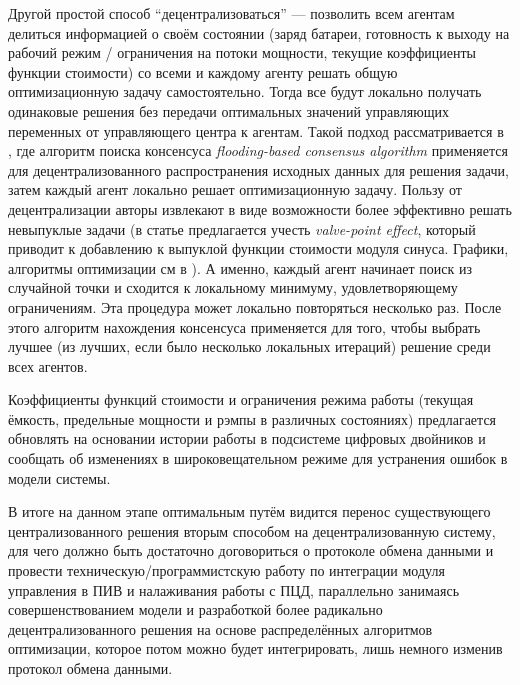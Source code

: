 \documentclass{report}
\begin{document}
Другой простой способ ``децентрализоваться'' --- позволить всем агентам делиться информацией о своём состоянии (заряд батареи, готовность к выходу на рабочий режим / ограничения на потоки мощности, текущие коэффициенты функции стоимости) со всеми и каждому агенту решать общую оптимизационную задачу самостоятельно.
Тогда все будут локально получать одинаковые решения без передачи оптимальных значений управляющих переменных от управляющего центра к агентам.
Такой подход рассматривается в \cite{elsayed2014fully}, где алгоритм поиска консенсуса \textit{flooding-based consensus algorithm} применяется для децентрализованного распространения исходных данных для решения задачи, затем каждый агент локально решает оптимизационную задачу.
Пользу от децентрализации авторы извлекают в виде возможности более эффективно решать невыпуклые задачи (в статье предлагается учесть \textit{valve-point effect}, который приводит к добавлению к выпуклой функции стоимости модуля синуса. Графики, алгоритмы оптимизации см в \cite{sharma2017solution}).
А именно, каждый агент начинает поиск из случайной точки и сходится к локальному минимуму, удовлетворяющему ограничениям.
Эта процедура может локально повторяться несколько раз.
После этого алгоритм нахождения консенсуса применяется для того, чтобы выбрать лучшее (из лучших, если было несколько локальных итераций) решение среди всех агентов.

Коэффициенты функций стоимости и ограничения режима работы (текущая ёмкость, предельные мощности и рэмпы в различных состояниях) предлагается обновлять на основании истории работы в подсистеме цифровых двойников и сообщать об изменениях в широковещательном режиме для устранения ошибок в модели системы.

В итоге на данном этапе оптимальным путём видится перенос существующего централизованного решения вторым способом на децентрализованную систему, для чего должно быть достаточно договориться о протоколе обмена данными и провести техническую/программистскую работу по интеграции модуля управления в ПИВ и налаживания работы с ПЦД, параллельно занимаясь совершенствованием модели и разработкой более радикально децентрализованного решения на основе распределённых алгоритмов оптимизации, которое потом можно будет интегрировать, лишь немного изменив протокол обмена данными.


\newpage
\printbibliography[heading=bibintoc, title={Список литературы}]
\end{document}
